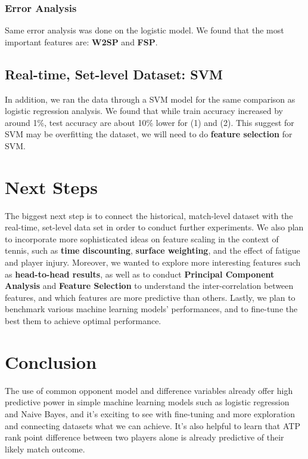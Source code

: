 \documentclass[paper=a4, fontsize=11pt]{scrartcl} %
\numberwithin{equation}{section} %
\numberwithin{figure}{section} %
\numberwithin{table}{section} %
\begin{document}
\subsubsection{Error Analysis}
Same error analysis was done on the logistic model.  We found that the most important features are: \textbf{W2SP} and \textbf{FSP}.
\subsection{Real-time, Set-level Dataset:  SVM}
In addition, we ran the data through a SVM model for the same comparison as logistic regression analysis.  We found that while train accuracy increased by around 1\%, test accuracy are about 10\%  lower for (1) and (2).  This suggest for SVM may be overfitting the dataset, we will need to do \textbf{feature selection} for SVM.


\section{Next Steps}
The biggest next step is to connect the historical, match-level dataset with the real-time, set-level data set in order to conduct further experiments. We also plan to incorporate more sophisticated ideas on feature scaling in the context of tennis, such as \textbf{time discounting}, \textbf{surface weighting}, and the effect of fatigue and player injury. Moreover, we wanted to explore more interesting features such as \textbf{head-to-head results}, as well as to conduct \textbf{Principal Component Analysis} and \textbf{Feature Selection} to understand the inter-correlation between features, and which features are more predictive than others. Lastly, we plan to benchmark various machine learning models' performances, and to fine-tune the best them to achieve optimal performance. 
\section{Conclusion}
The use of common opponent model and difference variables already offer high predictive power in simple machine learning models such as logistic regression and Naive Bayes, and it's exciting to see with fine-tuning and more exploration and connecting datasets what we can achieve. It's also helpful to learn that ATP rank point difference between two players alone is already predictive of their likely match outcome. 
\end{document}
